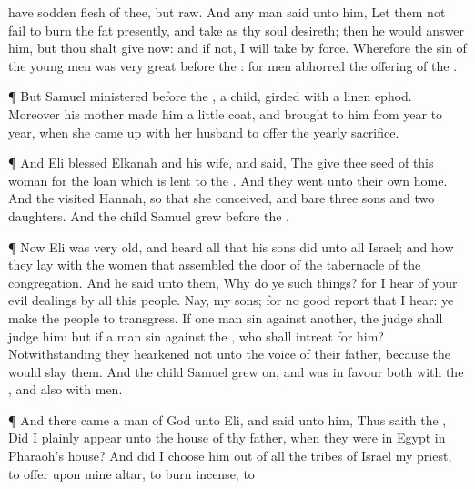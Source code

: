 {have
sodden
flesh of thee, but
raw.
And
{} any
man
said unto him, Let them not
fail to
burn the
fat
presently, and
{}
take
{} as thy
soul
desireth; then he would
answer him,
{} but thou shalt
give
{} now: and if not, I will
take
{} by
force.
Wherefore the
sin of the young
men was
very
great
before the
{}: for
men
abhorred the
offering of the
{}.
\par }{\PP {}¶ But
Samuel
ministered
before the
{},
{} a
child,
girded with a
linen
ephod.
Moreover his
mother
made him a
little
coat, and
brought
{} to him from
year to
year, when she came
up with her
husband to
offer the
yearly
sacrifice.
\par }{\PP {}¶ And
Eli
blessed
Elkanah and his
wife, and
said, The
{}
give thee
seed of this
woman for the
loan which is
lent to the
{}. And they
went unto their own
home.
And the
{}
visited
Hannah, so that she
conceived, and
bare
three
sons and
two
daughters. And the
child
Samuel
grew
before the
{}.
\par }{\PP {}¶ Now
Eli was
very
old, and
heard all that his
sons
did unto all
Israel; and how they
lay with the
women that
assembled
{} the
door of the
tabernacle of the
congregation.
And he
said unto them, Why
do ye such
things? for I
hear of your
evil
dealings by all this
people.
Nay, my
sons; for
{} no
good
report that I
hear: ye make the
{}
people to
transgress.
If one
man
sin against
another, the
judge shall
judge him: but if a
man
sin against the
{}, who shall
intreat for him? Notwithstanding they
hearkened not unto the
voice of their
father, because the
{}
would
slay them.
And the
child
Samuel
grew
on, and was in
favour both with the
{}, and also with
men.
\par }{\PP {}¶ And there
came a
man of
God unto
Eli, and
said unto him, Thus
saith the
{}, Did I
plainly
appear unto the
house of thy
father, when they were in
Egypt in
Pharaoh’s
house?
And did I
choose him out of all the
tribes of
Israel
{} my
priest, to
offer upon mine
altar, to
burn
incense, to
}
